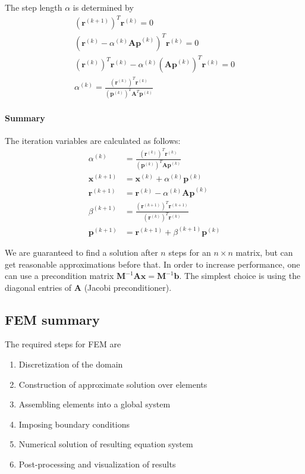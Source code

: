 \documentclass{article}
\begin{document}
The step length $\alpha$ is determined by
\begin{gather}
    (\bm{r}^{(k+1)})^T \bm{r}^{(k)} = 0\\
    (\bm{r}^{(k)} - \alpha^{(k)}\bm{Ap}^{(k)})^T \bm{r}^{(k)} = 0\\
    (\bm{r}^{(k)})^T\bm{r}^{(k)} - \alpha^{(k)} (\bm{Ap}^{(k)})^T \bm{r}^{(k)} = 0\\
    \alpha^{(k)} = \frac{(\bm{r}^{(k)})^T \bm{r}^{(k)}} {(\bm{p}^{(k)})^T \bm{A}^T \bm{p}^{(k)}}
\end{gather}

\paragraph{Summary}
The iteration variables are calculated as follows:
\begin{align}
    \alpha^{(k)} &= \frac{(\bm{r}^{(k)})^T \bm{r}^{(k)}} {(\bm{p}^{(k)})^T \bm{Ap}^{(k)}}\\
    \bm{x}^{(k+1)} &= \bm{x}^{(k)} + \alpha^{(k)} \bm{p}^{(k)}\\
    \bm{r}^{(k+1)} &= \bm{r}^{(k)} - \alpha^{(k)} \bm{Ap}^{(k)}\\
    \beta^{(k+1)} &= \frac{(\bm{r}^{(k+1)})^T \bm{r}^{(k+1)}} {(\bm{r}^{(k)})^T \bm{r}^{(k)}}\\
    \bm{p}^{(k+1)} &= \bm{r}^{(k+1)} + \beta^{(k+1)} \bm{p}^{(k)}
\end{align}

We are guaranteed to find a solution after $n$ steps for an $n \times n$ matrix, but can get reasonable approximations before that.
In order to increase performance, one can use a precondition matrix $\bm{M}^{-1}\bm{Ax} = \bm{M}^{-1}\bm{b}$.
The simplest choice is using the diagonal entries of $\bm{A}$ (Jacobi preconditioner).

\subsection{FEM summary}
The required steps for FEM are
\begin{enumerate}
    \item Discretization of the domain
    \item Construction of approximate solution over elements
    \item Assembling elements into a global system
    \item Imposing boundary conditions
    \item Numerical solution of resulting equation system
    \item Post-processing and visualization of results
\end{enumerate}
\end{document}

